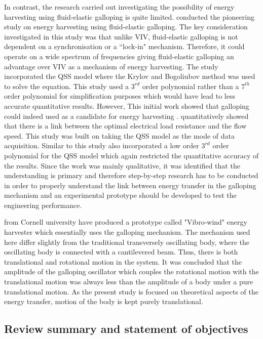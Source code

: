 In contrast, the research carried out investigating the possibility of energy harvesting using fluid-elastic galloping is quite limited. \citet{Barrero-Gil2010a} conducted the pioneering study on energy harvesting using fluid-elastic galloping. The key consideration investigated in this study was that unlike VIV, fluid-elastic galloping is not dependent on a synchronisation or a ``lock-in" mechanism. Therefore, it could operate on a wide spectrum of frequencies giving fluid-elastic galloping an advantage over VIV as a mechanism of energy harvesting. The study incorporated the QSS model where the Krylov and Bogoliubov method was used to solve the equation. This study used a $3^{rd}$ order polynomial rather than a $7^{th}$ order polynomial for simplification purposes which would have lead to less accurate quantitative results. However, This initial work showed that galloping could indeed used as a candidate for energy harvesting .\citet{vicente-Ludlam2014} quantitatively showed that there is a link between the optimal electrical load resistance and the flow speed. This study was built on \citet{Barrero-Gil2010a} taking the QSS model as the mode of data acquisition. Similar to \citet{Barrero-Gil2010a} this study also incorporated a low order $3^{rd}$ order polynomial for the QSS model which again restricted the quantitative accuracy of the results. Since the work was mainly qualitative, it was identified that the understanding is primary and therefore step-by-step research has to be conducted in order to properly understand the link between energy transfer in the galloping mechanism and an experimental prototype should be developed to test the engineering performance. 

\citet{Kluger2013} from Cornell university have produced a prototype called "Vibro-wind" energy harvester which essentially uses the galloping mechanism. The mechanism used here differ slightly from the traditional transversely oscillating body, where the oscillating body is connected with a cantilevered beam. Thus, there is both translational and rotational motion in the system. It was concluded that the amplitude of the galloping oscillator which couples the rotational motion with the translational motion was always less than the amplitude of a body under a pure translational motion. As the present study is focused on theoretical aspects of the energy transfer, motion of the body is kept purely translational.   


\subsection{Review summary and statement of objectives}


